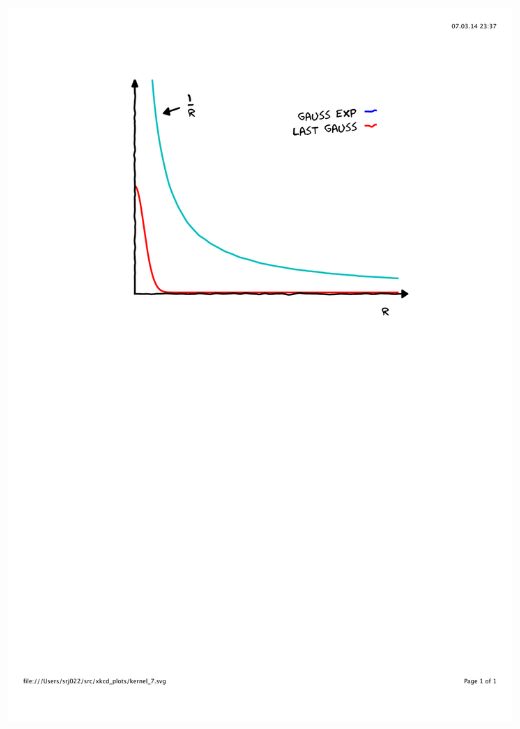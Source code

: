 \begin{frame}
\begin{columns}
\begin{column}{.50\textwidth}
{        \includegraphics[scale=0.4, clip, viewport = 110 450 490 800]
            {figures/kernel_7.pdf}}
\end{column}
\end{columns}
\end{frame}
